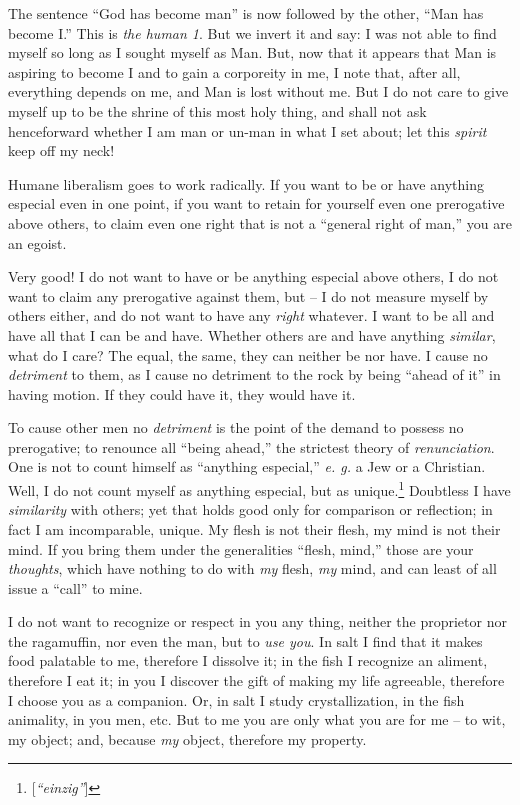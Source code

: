 \documentclass[12pt,a4paper]{book}
\begin{document}
The sentence ``God has become man'' is now followed by the other, ``Man has 
become I.'' This is \textit{the human 1}. But we invert it and say: I was not 
able to find myself so long as I sought myself as Man. But, now that it 
appears that Man is aspiring to become I and to gain a corporeity in me, I 
note that, after all, everything depends on me, and Man is lost without me. 
But I do not care to give myself up to be the shrine of this most holy thing, 
and shall not ask henceforward whether I am man or un-man in what I set about; 
let this \textit{spirit} keep off my neck!

Humane liberalism goes to work radically. If you want to be or have anything 
especial even in one point, if you want to retain for yourself even one 
prerogative above others, to claim even one right that is not a ``general 
right of man,'' you are an egoist.

Very good! I do not want to have or be anything especial above others, I do 
not want to claim any prerogative against them, but -- I do not measure myself 
by others either, and do not want to have any \textit{right} whatever. I want 
to be all and have all that I can be and have. Whether others are and have 
anything \textit{similar}, what do I care? The equal, the same, they can 
neither be nor have. I cause no \textit{detriment} to them, as I cause no 
detriment to the rock by being ``ahead of it'' in having motion. If they 
could have it, they would have it.

To cause other men no \textit{detriment} is the point of the demand to possess 
no prerogative; to renounce all ``being ahead,'' the strictest theory of 
\textit{renunciation}. One is not to count himself as ``anything especial,'' 
\textit{e. g.} a Jew or a Christian. Well, I do not count myself as anything 
especial, but as unique.\footnote{[\textit{``einzig''}]} Doubtless I have 
\textit{similarity} with others; yet that holds good only for comparison or 
reflection; in fact I am incomparable, unique. My flesh is not their flesh, my 
mind is not their mind. If you bring them under the generalities ``flesh, 
mind,'' those are your \textit{thoughts}, which have nothing to do with 
\textit{my} flesh, \textit{my} mind, and can least of all issue a ``call'' 
to mine.

I do not want to recognize or respect in you any thing, neither the proprietor 
nor the ragamuffin, nor even the man, but to \textit{use you}. In salt I find 
that it makes food palatable to me, therefore I dissolve it; in the fish I 
recognize an aliment, therefore I eat it; in you I discover the gift of making 
my life agreeable, therefore I choose you as a companion. Or, in salt I study 
crystallization, in the fish animality, in you men, etc. But to me you are 
only what you are for me -- to wit, my object; and, because \textit{my} 
object, therefore my property.
\end{document}
